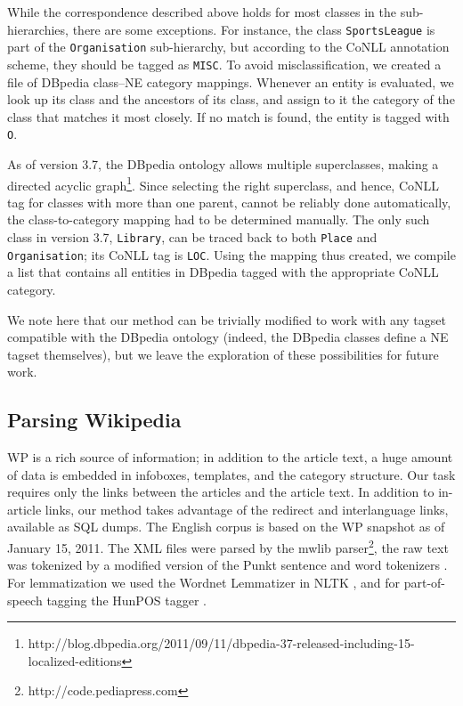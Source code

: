 \documentclass[11pt]{article}
\begin{document}
While the correspondence described above holds for most classes in the
sub-hierarchies, there are some exceptions. For instance, the class
\texttt{SportsLeague} is part of the \texttt{Organisation} sub-hierarchy, but
according to the CoNLL annotation scheme, they should be tagged as
\texttt{MISC}.  To avoid misclassification,
we created a file of DBpedia class--NE category mappings. Whenever an entity is evaluated, we look up its class and the ancestors of its class, and assign to it the category of the class that matches it most closely. If no match is found, the entity is tagged with \texttt{O}. 

As of version 3.7, the DBpedia ontology allows multiple superclasses, making a
directed acyclic
graph\footnote{http://blog.dbpedia.org/2011/09/11/dbpedia-37-released-including-15-localized-editions}. Since
selecting the right superclass, and hence, CoNLL tag for classes with more
than one parent, cannot be reliably done automatically, the class-to-category
mapping had to be determined manually. The only such class in version 3.7,
\texttt{Library}, can be traced back to both \texttt{Place} and
\texttt{Organisation}; its CoNLL tag is \texttt{LOC}.  Using the mapping thus
created, we compile a list that contains all entities in DBpedia tagged with
the appropriate CoNLL category.

We note here that our method can be trivially modified to work with any tagset
compatible with the DBpedia ontology (indeed, the DBpedia classes define a NE
tagset themselves), but we leave the exploration of these possibilities for
future work.

\subsection{Parsing Wikipedia}

WP is a rich source of information; in addition to the article text, a huge
amount of data is embedded in infoboxes, templates, and the category
structure. Our task requires only the links between the articles and the
article text. In addition to in-article links, our method takes advantage of
the redirect and interlanguage links, available as SQL dumps. The English
corpus is based on the WP snapshot as of January 15, 2011. The XML files were
parsed by the mwlib parser\footnote{http://code.pediapress.com}, the raw
text was tokenized by a modified version of the Punkt sentence and word
tokenizers \cite{Kiss:06}. For lemmatization we used the Wordnet Lemmatizer in
NLTK \cite{Bird:09}, and for part-of-speech tagging the HunPOS tagger
\cite{Halacsy:07}.
\end{document}
